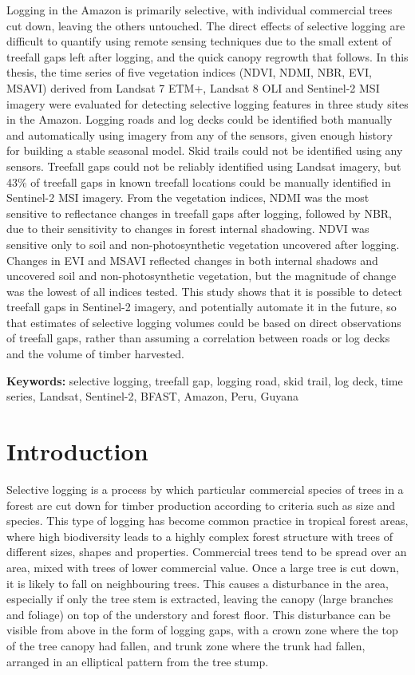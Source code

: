 \documentclass[a4paper,12pt]{scrbook}
\begin{document}
Logging in the Amazon is primarily selective, with individual commercial trees cut down, leaving the others untouched. The direct effects of selective logging are difficult to quantify using remote sensing techniques due to the small extent of treefall gaps left after logging, and the quick canopy regrowth that follows. In this thesis, the time series of five vegetation indices (NDVI, NDMI, NBR, EVI, MSAVI) derived from Landsat 7 ETM+, Landsat 8 OLI and Sentinel-2 MSI imagery were evaluated for detecting selective logging features in three study sites in the Amazon. Logging roads and log decks could be identified both manually and automatically using imagery from any of the sensors, given enough history for building a stable seasonal model. Skid trails could not be identified using any sensors. Treefall gaps could not be reliably identified using Landsat imagery, but 43\% of treefall gaps in known treefall locations could be manually identified in Sentinel-2 MSI imagery. From the vegetation indices, NDMI was the most sensitive to reflectance changes in treefall gaps after logging, followed by NBR, due to their sensitivity to changes in forest internal shadowing. NDVI was sensitive only to soil and non-photosynthetic vegetation uncovered after logging. Changes in EVI and MSAVI reflected changes in both internal shadows and uncovered soil and non-photosynthetic vegetation, but the magnitude of change was the lowest of all indices tested. This study shows that it is possible to detect treefall gaps in Sentinel-2 imagery, and potentially automate it in the future, so that estimates of selective logging volumes could be based on direct observations of treefall gaps, rather than assuming a correlation between roads or log decks and the volume of timber harvested.

\textbf{Keywords:} selective logging, treefall gap, logging road, skid trail, log deck, time series, Landsat, Sentinel-2, BFAST, Amazon, Peru, Guyana

\tableofcontents

\chapter{Introduction}

Selective logging is a process by which particular commercial species of trees in a forest are cut down for timber production according to criteria such as size and species. This type of logging has become common practice in tropical forest areas, where high biodiversity leads to a highly complex forest structure with trees of different sizes, shapes and properties. Commercial trees tend to be spread over an area, mixed with trees of lower commercial value. Once a large tree is cut down, it is likely to fall on neighbouring trees. This causes a disturbance in the area, especially if only the tree stem is extracted, leaving the canopy (large branches and foliage) on top of the understory and forest floor. This disturbance can be visible from above in the form of logging gaps, with a crown zone where the top of the tree canopy had fallen, and trunk zone where the trunk had fallen, arranged in an elliptical pattern from the tree stump.
\end{document}
